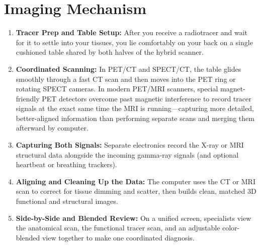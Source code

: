 \section{Imaging Mechanism}
\begin{enumerate}
    \item \textbf{Tracer Prep and Table Setup:} After you receive a radiotracer and wait for it to settle into your tissues, you lie comfortably on your back on a single cushioned table shared by both halves of the hybrid scanner.
    \item \textbf{Coordinated Scanning:} In PET/CT and SPECT/CT, the table glides smoothly through a fast CT scan and then moves into the PET ring or rotating SPECT cameras. In modern PET/MRI scanners, special magnet-friendly PET detectors overcome past magnetic interference to record tracer signals at the exact same time the MRI is running---capturing more detailed, better-aligned information than performing separate scans and merging them afterward by computer.
    \item \textbf{Capturing Both Signals:} Separate electronics record the X-ray or MRI structural data alongside the incoming gamma-ray signals (and optional heartbeat or breathing trackers).
    \item \textbf{Aligning and Cleaning Up the Data:} The computer uses the CT or MRI scan to correct for tissue dimming and scatter, then builds clean, matched 3D functional and structural images.
    \item \textbf{Side-by-Side and Blended Review:} On a unified screen, specialists view the anatomical scan, the functional tracer scan, and an adjustable color-blended view together to make one coordinated diagnosis.
\end{enumerate}


